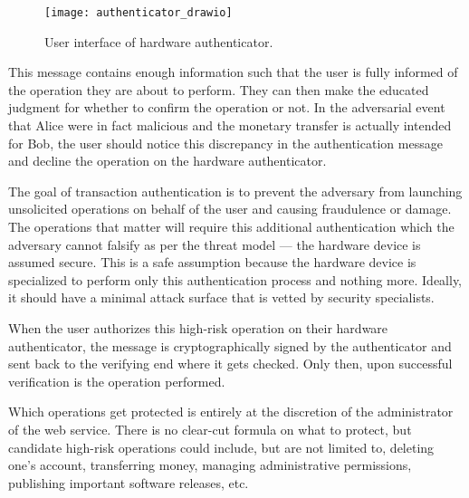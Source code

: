 \begin{figure}[h]
  \centering
  \texttt{[image: authenticator\_drawio]}
  \caption{User interface of hardware authenticator.}

\end{figure}

This message contains enough information such that the user is fully informed of the operation they are about to perform. They can then make the educated judgment for whether to confirm the operation or not. In the adversarial event that Alice were in fact malicious and the monetary transfer is actually intended for Bob, the user should notice this discrepancy in the authentication message and decline the operation on the hardware authenticator. 

The goal of transaction authentication is to prevent the adversary from launching unsolicited operations on behalf of the user and causing fraudulence or damage. The operations that matter will require this additional authentication which the adversary cannot falsify as per the threat model --- the hardware device is assumed secure. This is a safe assumption because the hardware device is specialized to perform only this authentication process and nothing more. Ideally, it should have a minimal attack surface that is vetted by security specialists. 

When the user authorizes this high-risk operation on their hardware authenticator, the message is cryptographically signed by the authenticator and sent back to the verifying end where it gets checked. Only then, upon successful verification is the operation performed. 

Which operations get protected is entirely at the discretion of the administrator of the web service. There is no clear-cut formula on what to protect, but candidate high-risk operations could include, but are not limited to, deleting one's account, transferring money, managing administrative permissions, publishing important software releases, etc. 





